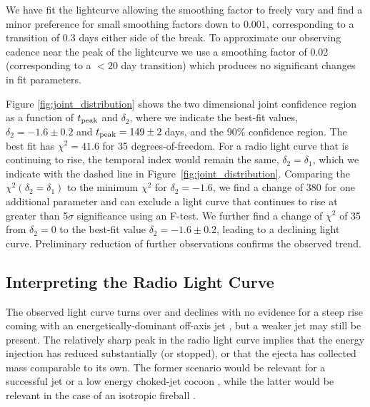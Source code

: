 We have fit the lightcurve allowing the smoothing factor to freely vary and find a minor preference for small smoothing factors down to 0.001, corresponding to a transition of 0.3 days either side of the break. To approximate our observing cadence near the peak of the lightcurve we use a smoothing factor of 0.02 (corresponding to a $<20$ day transition) which produces no significant changes in fit parameters.

\pagebreak
Figure \ref{fig:joint_distribution} shows the two dimensional joint confidence region as a function of $t_{\rm peak}$ and $\delta_2$, where we indicate the best-fit values, $\delta_2=-1.6 \pm 0.2$ and $t_{\rm peak}=149 \pm 2$\,days, and the 90\% confidence region. The best fit has $\chi^2=41.6$ for 35 degrees-of-freedom. For a radio light curve that is continuing to rise, the temporal index would remain the same, $\delta_2=\delta_1$, which we indicate with the dashed line in Figure~\ref{fig:joint_distribution}. Comparing the $\chi^2(\delta_2=\delta_1)$ to the minimum $\chi^2$ for $\delta_2=-1.6$, we find a change of 380 for one additional parameter and can exclude a light curve that continues to rise at greater than 5$\sigma$ significance using an F-test. We further find a change of $\chi^2$ of 35 from $\delta_2=0$ to the best-fit value $\delta_2=-1.6\pm0.2$, leading to a declining light curve. Preliminary reduction of further observations confirms the observed trend.

 





\vspace{-5pt}
\subsection{Interpreting the Radio Light Curve}
\label{subsec:models}
\vspace{-5pt}
The observed light curve turns over and declines with no evidence for a steep rise coming with an energetically-dominant off-axis jet \citep{2018MNRAS.478..407N}, but a weaker jet may still be present. The relatively sharp peak in the radio light curve implies that the energy injection has reduced substantially (or stopped), or that the ejecta has collected mass comparable to its own. The former scenario would be relevant for a successful jet \citep[e.g.,][]{2017Sci...358.1559K,2018PhRvL.120x1103L,2018Natur.554..207M,2018ApJ...856L..18M,2018MNRAS.478L..18T,2018A&A...613L...1D} or a low energy choked-jet cocoon \citep[e.g.,][]{2017Sci...358.1559K,2018MNRAS.479..588G,2018ApJ...855..103P,2018Natur.554..207M}, while the latter would be relevant in the case of an isotropic fireball \citep[i.e., dynamical ejecta;][]{2011Natur.478...82N,2018Natur.554..207M,2018A&A...613L...1D,2018ApJ...867...95H}.


